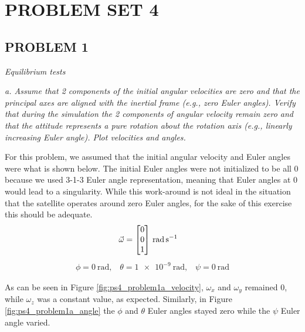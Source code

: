 \section{\Large PROBLEM SET 4}
\subsection{PROBLEM 1}
\textit{Equilibrium tests}

\textit{a. Assume that 2 components of the initial angular velocities are zero and that the principal axes are aligned with the inertial frame (e.g., zero Euler angles). Verify that during the simulation the 2 components of angular velocity remain zero and that the attitude represents a pure rotation about the rotation axis (e.g., linearly increasing Euler angle). Plot velocities and angles.}

For this problem, we assumed that the initial angular velocity and Euler angles were what is shown below. The initial Euler angles were not initialized to be all 0 because we used 3-1-3 Euler angle representation, meaning that Euler angles at 0 would lead to a singularity. While this work-around is not ideal in the situation that the satellite operates around zero Euler angles, for the sake of this exercise this should be adequate.
\begin{align*}
\Vec{\omega} &= 
\qty[parse-numbers = false]{
    \begin{bmatrix}
    0 \\
    0 \\
    1 \\ 
    \end{bmatrix}
}{\radian\per\s}
\end{align*}
\begin{align*}
\phi = \qty[parse-numbers = false]{0}{\radian}, \;\;\;
\theta = \qty[parse-numbers = false]{1e-9}{\radian}, \;\;\;
\psi = \qty[parse-numbers = false]{0}{\radian}
\end{align*}

As can be seen in Figure \ref{fig:ps4_problem1a_velocity}, $\omega_x$ and $\omega_y$ remained 0, while $\omega_z$ was a constant value, as expected. Similarly, in Figure \ref{fig:ps4_problem1a_angle} the $\phi$ and $\theta$ Euler angles stayed zero while the $\psi$ Euler angle varied. 

